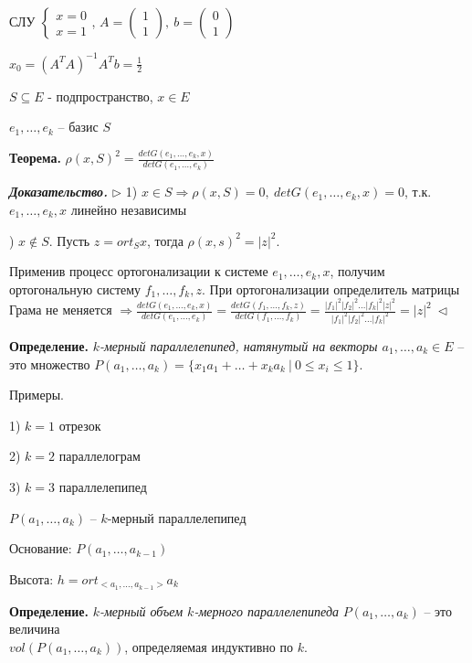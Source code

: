 СЛУ $\begin{cases}
		x = 0 \\
		x = 1
	\end{cases}$, $A = \begin{pmatrix} 1 \\ 1 \end{pmatrix}, \ b = \begin{pmatrix} 0 \\ 1 \end{pmatrix}$

\bigskip
$x_0 = (A^T A)^{-1} A^T b = \frac{1}{2}$

\bigskip
$S \subseteq E$ - подпространство, $x \in E$

$e_1, \dots, e_k$ -- базис $S$

\bigskip
\textbf{Теорема.} $\rho (x, S)^2 = \frac{det G(e_1, \dots, e_k, x)}{det G(e_1, \dots, e_k)}$

\bigskip
\textbf{\textit{Доказательство.}} $\rhd$ 1) $x \in S \Rightarrow \rho (x, S) = 0, \ det G(e_1, \dots, e_k, x) = 0$, т.к. $e_1, \dots, e_k, x$ линейно независимы

) $x \notin S$. Пусть $z = ort_S x$, тогда $\rho(x, s)^2 = |z|^2$.

Применив процесс ортогонализации к системе $e_1, \dots, e_k, x$, получим ортогональную систему $f_1, \dots, f_k, z$. При ортогонализации определитель матрицы Грама не меняется $\Rightarrow \frac{det G(e_1, \dots, e_k, x)}{det G(e_1, \dots, e_k)} = \frac{det G(f_1, \dots, f_k, z)}{det G(f_1, \dots, f_k)} = \frac{|f_1|^2 |f_2|^2 \dots |f_k|^2 |z|^2}{|f_1|^2 |f_2|^2 \dots |f_k|^2} = |z|^2 \ \lhd$

\bigskip
\textbf{Определение.} \textit{$k$-мерный параллелепипед, натянутый на векторы $a_1, \dots, a_k \in E$} -- это множество $P(a_1, \dots, a_k) = \{ x_1 a_1 + \dots + x_k a_k \ | \ 0 \leq x_i \leq 1 \}$. 

\bigskip
Примеры.

1) $k = 1$  отрезок

2) $k = 2$ параллелограм

3) $k = 3$ параллелепипед

\bigskip
$P(a_1, \dots, a_k)$ -- $k$-мерный параллелепипед

Основание: $P(a_1, \dots, a_{k-1})$

Высота: $h = ort_{<a_1, \dots, a_{k-1}>} a_k$

\bigskip
\textbf{Определение.} \textit{$k$-мерный объем $k$-мерного параллелепипеда} $P(a_1, \dots, a_k)$ -- это величина \\ $vol(P(a_1, \dots, a_k))$, определяемая индуктивно по $k$.

